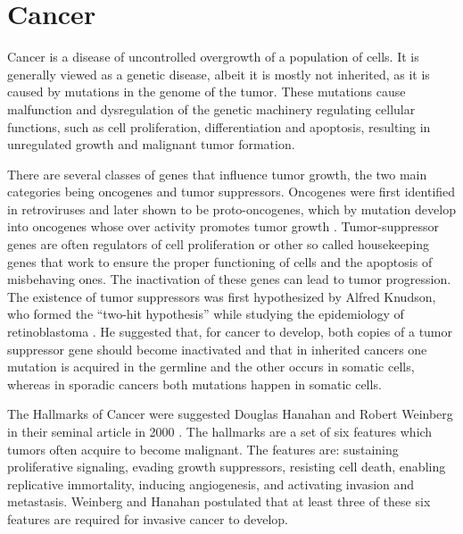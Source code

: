 
\section{Cancer}\label{cancer}

Cancer is a disease of uncontrolled overgrowth of a population of cells. It is
generally viewed as a genetic disease, albeit it is mostly not inherited, as it is
caused by  mutations in the genome of the tumor. These mutations cause malfunction
and dysregulation of the genetic machinery regulating cellular functions, such
as cell proliferation, differentiation and apoptosis, resulting in
unregulated growth and malignant tumor formation.

There are several classes of genes that influence tumor growth, the two main
categories being oncogenes and tumor suppressors. Oncogenes were first
identified in retroviruses and later shown to be proto-oncogenes, which by
mutation develop into oncogenes whose over activity promotes tumor growth
\citep{Varmus1988}. Tumor-suppressor genes are often regulators of cell
proliferation or other so called housekeeping genes that work to ensure the
proper functioning of cells and the apoptosis of misbehaving ones. The
inactivation of these genes can lead to tumor progression. The existence of
tumor suppressors was first hypothesized by Alfred Knudson, who formed the
“two-hit hypothesis” while studying the epidemiology of retinoblastoma
\citep{Knudson1971}. He suggested that, for cancer to develop, both copies of
a tumor suppressor gene should become inactivated and that in inherited
cancers one mutation is acquired in the germline and the other occurs in
somatic cells, whereas in sporadic cancers both mutations happen in somatic
cells.

The Hallmarks of Cancer were suggested Douglas Hanahan and Robert Weinberg in
their seminal article in 2000 \citep{Hanahan2000}. The hallmarks are a set of
six features which tumors often acquire to become malignant. The features are:
sustaining proliferative signaling, evading growth suppressors, resisting cell
death, enabling replicative immortality, inducing angiogenesis, and activating
invasion and metastasis. Weinberg and Hanahan postulated that at least three
of these six features are required for invasive cancer to develop.


